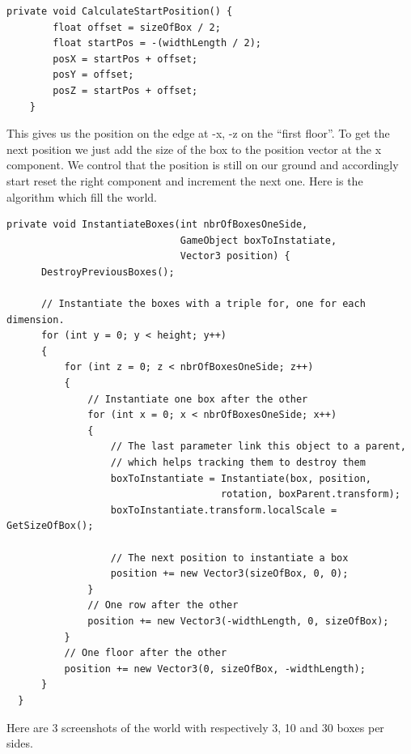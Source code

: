\documentclass{scrartcl}
\begin{document}
\begin{lstlisting}[language={[Sharp]C}]
  private void CalculateStartPosition() {
        float offset = sizeOfBox / 2;
        float startPos = -(widthLength / 2);
        posX = startPos + offset;
        posY = offset;
        posZ = startPos + offset;
    }

\end{lstlisting}

This gives us the position on the edge at -x, -z on the “first floor”. To get the next position we just add the size of the box to the position vector at the x component. 
We control that the position is still on our ground and accordingly start reset the right component and increment the next one. Here is the algorithm which fill the world.

\begin{lstlisting}[language={[Sharp]C}]
private void InstantiateBoxes(int nbrOfBoxesOneSide, 
                              GameObject boxToInstatiate, 
                              Vector3 position) {
      DestroyPreviousBoxes();

      // Instantiate the boxes with a triple for, one for each dimension.
      for (int y = 0; y < height; y++)
      {
          for (int z = 0; z < nbrOfBoxesOneSide; z++)
          {
              // Instantiate one box after the other
              for (int x = 0; x < nbrOfBoxesOneSide; x++)
              {
                  // The last parameter link this object to a parent, 
                  // which helps tracking them to destroy them
                  boxToInstantiate = Instantiate(box, position, 
                                     rotation, boxParent.transform);
                  boxToInstantiate.transform.localScale = GetSizeOfBox();

                  // The next position to instantiate a box
                  position += new Vector3(sizeOfBox, 0, 0);
              }
              // One row after the other
              position += new Vector3(-widthLength, 0, sizeOfBox);
          }
          // One floor after the other
          position += new Vector3(0, sizeOfBox, -widthLength);
      }   
  }

\end{lstlisting}

Here are 3 screenshots of the world with respectively 3, 10 and 30 boxes per sides.
\end{document}
